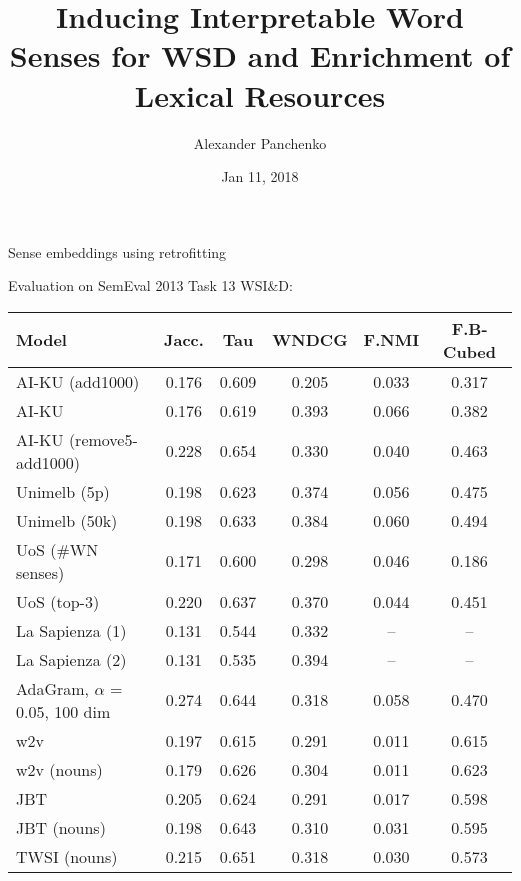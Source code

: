 \documentclass[usenames,dvipsnames]{beamer}
\title{Inducing Interpretable Word Senses for WSD and Enrichment of Lexical Resources}
\author{Alexander Panchenko}
\date[11.02.2018]{Jan 11, 2018}
\begin{document}
\maketitle









\begin{frame}{Sense embeddings using retrofitting}

Evaluation on SemEval 2013 Task 13  WSI\&D:


	\vspace{-0.4cm}
	\begin{table}
		\scriptsize

		\begin{tabular}{l|ccc|cc}
			\bf Model & \bf Jacc. & \bf Tau & \bf WNDCG & \bf F.NMI & \bf F.B-Cubed \\ 
			\midrule
			
			AI-KU (add1000) & 0.176 & 0.609 & 0.205 & 0.033 & 0.317 \\
			AI-KU & 0.176 & 0.619 & 0.393 & 0.066 & 0.382 \\
			AI-KU (remove5-add1000) & 0.228 & 0.654 & 0.330 & 0.040 & 0.463 \\
			Unimelb (5p) & 0.198 & 0.623 & 0.374 & 0.056 & 0.475 \\
			Unimelb (50k) & 0.198 & 0.633 & 0.384 & 0.060 & 0.494 \\
			UoS (\#WN senses) & 0.171 & 0.600 & 0.298 & 0.046 & 0.186 \\
			UoS (top-3) & 0.220 & 0.637 & 0.370 & 0.044 & 0.451 \\
			La Sapienza (1) & 0.131 & 0.544 & 0.332 & --  & -- \\
			La Sapienza (2) & 0.131 & 0.535 & 0.394 & -- & -- \\ \midrule
			AdaGram, $\alpha$ = 0.05, 100 dim & 0.274 & 0.644  & 0.318  & 0.058  & 0.470  \\ \midrule
			\alert{w2v}  & 0.197 & 0.615 & 0.291 & 0.011 & 0.615 \\
			\alert{w2v (nouns)} & 0.179 & 0.626 & 0.304 & 0.011 & 0.623 \\
			
			\alert{JBT} & 0.205 & 0.624 & 0.291 & 0.017 & 0.598\\
			\alert{JBT (nouns)} & 0.198 & 0.643 & 0.310 & 0.031 & 0.595\\
			\alert{TWSI (nouns)} & 0.215 & 0.651 & 0.318 & 0.030 & 0.573 \\ 
				
		\end{tabular}
		\end{table}
\end{frame}





\end{document}
